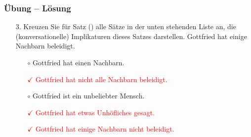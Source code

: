 	
	\begin{frame}
		\frametitle{Übung -- Lösung}
		
		\begin{enumerate}
			\item[3.] Kreuzen Sie für Satz () alle Sätze in der unten stehenden Liste an, die (konversationelle) Implikaturen dieses Satzes darstellen.
			\ea
			Gottfried hat einige Nachbarn beleidigt.
			\z 
			\begin{itemize}
				\item[$\circ$] Gottfried hat einen Nachbarn.
				\item[\textcolor{red}{$\checkmark$}] \textcolor{red}{Gottfried hat nicht alle Nachbarn beleidigt.}
				\item[$\circ$] Gottfried ist ein unbeliebter Mensch.
				\item[\textcolor{red}{$\checkmark$}] \textcolor{red}{Gottfried hat etwas Unhöfliches gesagt.}
				\item[\textcolor{red}{$\checkmark$}] \textcolor{red}{Gottfried hat einige Nachbarn nicht beleidigt.}
			\end{itemize}
			
		\end{enumerate}


\end{frame}